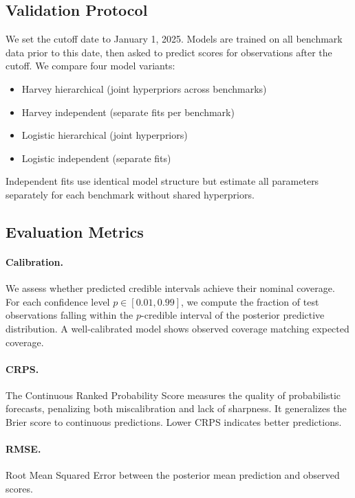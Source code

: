 \documentclass[letterpaper,twocolumn]{article}
\begin{document}
\subsection{Validation Protocol}

We set the cutoff date to January 1, 2025. Models are trained on all benchmark data prior to this date, then asked to predict scores for observations after the cutoff. We compare four model variants:
\begin{itemize}
    \item Harvey hierarchical (joint hyperpriors across benchmarks)
    \item Harvey independent (separate fits per benchmark)
    \item Logistic hierarchical (joint hyperpriors)
    \item Logistic independent (separate fits)
\end{itemize}

Independent fits use identical model structure but estimate all parameters separately for each benchmark without shared hyperpriors.

\subsection{Evaluation Metrics}

\paragraph{Calibration.} We assess whether predicted credible intervals achieve their nominal coverage. For each confidence level $p \in [0.01, 0.99]$, we compute the fraction of test observations falling within the $p$-credible interval of the posterior predictive distribution. A well-calibrated model shows observed coverage matching expected coverage.

\paragraph{CRPS.} The Continuous Ranked Probability Score measures the quality of probabilistic forecasts, penalizing both miscalibration and lack of sharpness. It generalizes the Brier score to continuous predictions. Lower CRPS indicates better predictions.

\paragraph{RMSE.} Root Mean Squared Error between the posterior mean prediction and observed scores.
\end{document}

